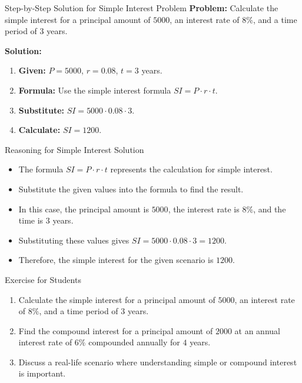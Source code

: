\begin{frame}{Step-by-Step Solution for Simple Interest Problem}
  \textbf{Problem:} Calculate the simple interest for a principal amount of $5000$, an interest rate of $8\%$, and a time period of $3$ years.

  \textbf{Solution:}
  \begin{enumerate}
    \item \textbf{Given:} $P = 5000$, $r = 0.08$, $t = 3$ years.
    \item \textbf{Formula:} Use the simple interest formula $SI = P \cdot r \cdot t$.
    \item \textbf{Substitute:} $SI = 5000 \cdot 0.08 \cdot 3$.
    \item \textbf{Calculate:} $SI = 1200$.
  \end{enumerate}
\end{frame}

\begin{frame}{Reasoning for Simple Interest Solution}
  \begin{itemize}
    \item The formula $SI = P \cdot r \cdot t$ represents the calculation for simple interest.
    \item Substitute the given values into the formula to find the result.
    \item In this case, the principal amount is $5000$, the interest rate is $8\%$, and the time is $3$ years.
    \item Substituting these values gives $SI = 5000 \cdot 0.08 \cdot 3 = 1200$.
    \item Therefore, the simple interest for the given scenario is $1200$.
  \end{itemize}
\end{frame}

\begin{frame}{Exercise for Students}
  \begin{enumerate}
    \item Calculate the simple interest for a principal amount of $5000$, an interest rate of $8\%$, and a time period of $3$ years.
    \item Find the compound interest for a principal amount of $2000$ at an annual interest rate of $6\%$ compounded annually for $4$ years.
    \item Discuss a real-life scenario where understanding simple or compound interest is important.
  \end{enumerate}
\end{frame}


